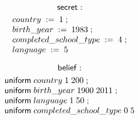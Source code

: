 $$ \mathsf{secret}: $$
\begin{displaymath}{\small
\begin{array}{l}
  \sassign{country}{1}\; ;\\
  \sassign{birth\text{\_}year}{1983}\; ;\\
  \sassign{completed\text{\_}school\text{\_}type}{4}\; ;\\
  \sassign{language}{5}\\
\end{array}
}
\end{displaymath}

$$ \mathsf{belief}: $$
\begin{displaymath}{\small
\begin{array}{l}
  \suniform{country}{1}{200}\; ;\\
  \suniform{birth\text{\_}year}{1900}{2011}\; ;\\
  \suniform{language}{1}{50}\; ;\\
  \suniform{completed\text{\_}school\text{\_}type}{0}{5}\\
\end{array}
}
\end{displaymath}

